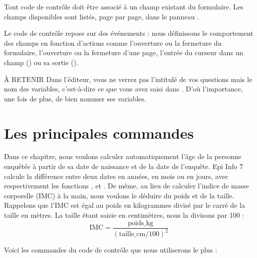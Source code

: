 Tout code de contrôle doit être associé à un champ existant du formulaire. Les champs disponibles sont listés, page par page, dans le panneau .

Le code de contrôle repose sur des événements : nous définissons le comportement des champs en fonction d'actions comme l'ouverture ou la fermeture du formulaire, l'ouverture ou la fermeture d'une page, l'entrée du curseur dans un champ () ou sa sortie ().

\begin{mybox}[colbacktitle=NOTE]{\faInfoCircle{} À RETENIR}
Dans l'éditeur, vous ne verrez pas l'intitulé de vos questions mais le nom des variables, c'est-à-dire ce que vous avez saisi dans . D'où l'importance, une fois de plus, de bien nommer ses variables.
\end{mybox}

\section{Les principales commandes}

Dans ce chapitre, nous voulons calculer automatiquement l'âge de la personne enquêtée à partir de sa date de naissance et de la date de l'enquête. Epi Info 7 calcule la différence entre deux dates en années, en mois ou en jours, avec respectivement les fonctions ,  et . De même, au lieu de calculer l'indice de masse corporelle (IMC) à la main, nous voulons le déduire du poids et de la taille. Rappelons que l'IMC est égal au poids en kilogrammes divisé par le carré de la taille en mètres. La taille étant saisie en centimètres, nous la divisons par 100 :
\[
\text{IMC} = \frac{\text{poids\_kg}}{\left(\text{taille\_cm}/100\right)^2}
\]

Voici les commandes du code de contrôle que nous utiliserons le plus :

